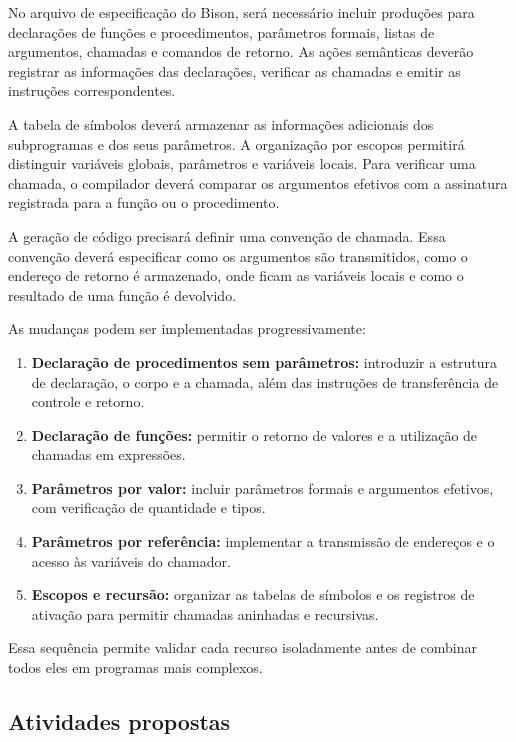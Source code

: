 \documentclass[
  brazilian,
  letterpaper,
]{book}
\providecommand{\tightlist}{%
  \setlength{\itemsep}{0pt}\setlength{\parskip}{0pt}}
\theoremstyle{plain}
\theoremstyle{definition}
\theoremstyle{remark}
\begin{document}
No arquivo de especificação do Bison, será necessário incluir produções
para declarações de funções e procedimentos, parâmetros formais, listas
de argumentos, chamadas e comandos de retorno. As ações semânticas
deverão registrar as informações das declarações, verificar as chamadas
e emitir as instruções correspondentes.

A tabela de símbolos deverá armazenar as informações adicionais dos
subprogramas e dos seus parâmetros. A organização por escopos permitirá
distinguir variáveis globais, parâmetros e variáveis locais. Para
verificar uma chamada, o compilador deverá comparar os argumentos
efetivos com a assinatura registrada para a função ou o procedimento.

A geração de código precisará definir uma convenção de chamada. Essa
convenção deverá especificar como os argumentos são transmitidos, como o
endereço de retorno é armazenado, onde ficam as variáveis locais e como
o resultado de uma função é devolvido.

As mudanças podem ser implementadas progressivamente:

\begin{enumerate}
\def\labelenumi{\arabic{enumi}.}
\tightlist
\item
  \textbf{Declaração de procedimentos sem parâmetros:} introduzir a
  estrutura de declaração, o corpo e a chamada, além das instruções de
  transferência de controle e retorno.
\item
  \textbf{Declaração de funções:} permitir o retorno de valores e a
  utilização de chamadas em expressões.
\item
  \textbf{Parâmetros por valor:} incluir parâmetros formais e argumentos
  efetivos, com verificação de quantidade e tipos.
\item
  \textbf{Parâmetros por referência:} implementar a transmissão de
  endereços e o acesso às variáveis do chamador.
\item
  \textbf{Escopos e recursão:} organizar as tabelas de símbolos e os
  registros de ativação para permitir chamadas aninhadas e recursivas.
\end{enumerate}

Essa sequência permite validar cada recurso isoladamente antes de
combinar todos eles em programas mais complexos.

\subsection{Atividades propostas}\label{atividades-propostas}
\end{document}
